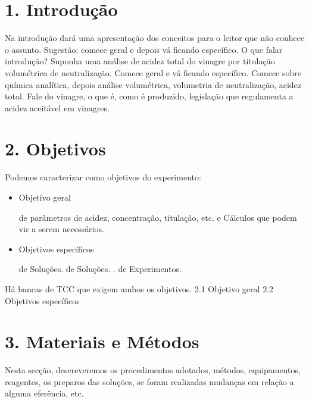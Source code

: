 \documentclass{article}%
\begin{document}
%
\normalsize%
\section{1. Introdução}%
\label{sec:1.Introduo}%

    Na introdução dará uma apresentação dos conceitos para o leitor que não conhece
    o assunto.       
    Sugestão: comece geral e depois vá ficando específico.       
    O que falar introdução? Suponha uma análise de acidez total do vinagre por       
    titulação volumétrica de neutralização. Comece geral e vá ficando específico. Comece       
    sobre química analítica, depois análise volumétrica, volumetria de neutralização, acidez       
    total. Fale do vinagre, o que é, como é produzido, legislação que regulamenta a acidez       
    aceitável em vinagres.
    

%
\section{2. Objetivos}%
\label{sec:2.Objetivos}%

        Podemos caracterizar como objetivos do experimento:
        \begin{itemize}
        \item Objetivo geral
            \begin{itemize}
             de parâmetros de acidez, concentração, titulação, etc.
            \Dimensionamentos e Cálculos que podem vir a serem necessários.
            \end{itemize}
            
        \item Objetivos específicos
            \begin{itemize}
            \Preparo de Soluções.
             de Soluções.
            .
            \Planejamento de Experimentos.
            \end{itemize}
        \end{itemize}
        
        Há bancas de TCC que exigem ambos os objetivos.
2.1 Objetivo geral%
2.2 Objetivos específicos

%
\section{3. Materiais e Métodos}%
\label{sec:3.MateriaiseMtodos}%

        Nesta secção, descreveremos os procedimentos adotados, métodos, equipamentos, reagentes, os preparos
        das soluções, se foram realizadas mudanças em relação a alguma eferência, etc.
        
\end{document}
